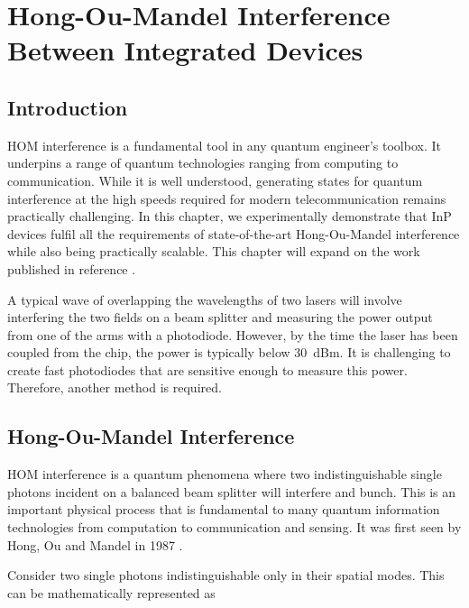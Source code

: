 %
%
\graphicspath{{./chapters/chapter03/fig03/}}

\let\textcircled=\pgftextcircled
\chapter[HOM Interference Between Integrated Devices]{Hong-Ou-Mandel Interference Between Integrated Devices}
\label{chap:hom}

\section{Introduction}

\ac{HOM} interference is a fundamental tool in any quantum engineer's toolbox. It underpins a range of quantum technologies ranging from computing to communication. While it is well understood, generating states for quantum interference at the high speeds required for modern telecommunication remains practically challenging. In this chapter, we experimentally demonstrate that \ac{InP} devices fulfil all the requirements of state-of-the-art Hong-Ou-Mandel interference while also being practically scalable. This chapter will expand on the work published in reference \cite{semenenko2019}. 

A typical wave of overlapping the wavelengths of two lasers will involve interfering the two fields on a beam splitter and measuring the power output from one of the arms with a photodiode. However, by the time the laser has been coupled from the chip, the power is typically below \SI{30}{dBm}. It is challenging to create fast photodiodes that are sensitive enough to measure this power. Therefore, another method is required.

\section{Hong-Ou-Mandel Interference}

\Ac{HOM} interference is a quantum phenomena where two indistinguishable single photons incident on a balanced beam splitter will interfere and bunch. This is an important physical process that is fundamental to many quantum information technologies from computation to communication and sensing. It was first seen by Hong, Ou and Mandel in 1987 \cite{HOM}. 

Consider two single photons indistinguishable only in their spatial modes. This can be mathematically represented as 

